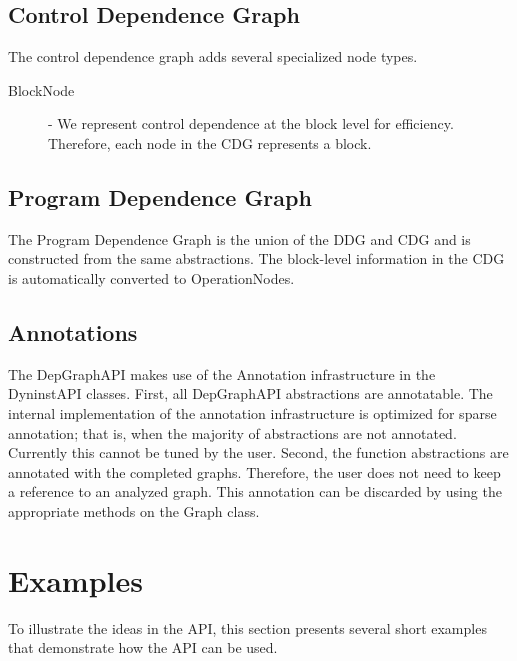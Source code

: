 \documentclass[12pt]{article}
\begin{document}
\subsection{Control Dependence Graph}

The control dependence graph adds several specialized node types.

\begin{description}
\item[BlockNode] - We represent
control dependence at the block level for efficiency. Therefore, each
node in the CDG represents a block. 
\end{description}

\subsection{Program Dependence Graph}
The Program Dependence Graph is the union of the DDG and CDG and is
constructed from the same abstractions. The block-level information in
the CDG is automatically converted to OperationNodes.

\subsection{Annotations} 

The DepGraphAPI makes use of the Annotation infrastructure in the
DyninstAPI classes. First, all DepGraphAPI abstractions are
annotatable. The internal implementation of the annotation
infrastructure is optimized for sparse annotation; that is, when the
majority of abstractions are not annotated. Currently this cannot be
tuned by the user. Second, the function abstractions are annotated
with the completed graphs. Therefore, the user does not need to keep a
reference to an analyzed graph. This annotation can be discarded by
using the appropriate methods on the Graph class.

\section{Examples} 

To illustrate the ideas in the API, this section presents several
short examples that demonstrate how the API can be used.  
\end{document}
